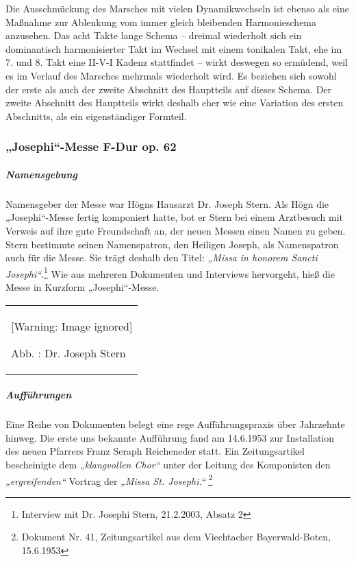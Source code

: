 \documentclass[a4paper]{article}
\newcommand\textstyleZitate[1]{\textit{#1}}
\newcounter{Abb}
\renewcommand\theAbb{\arabic{Abb}}
\begin{document}
Die Ausschmückung des Marsches mit vielen Dynamikwechseln ist ebenso als
eine Maßnahme zur Ablenkung vom immer gleich bleibenden Harmonieschema
anzusehen. Das acht Takte lange Schema – dreimal wiederholt sich ein
dominantisch harmonisierter Takt im Wechsel mit einem tonikalen Takt,
ehe im 7. und 8. Takt eine\newline
II-V-I Kadenz stattfindet – wirkt deswegen so ermüdend, weil es im
Verlauf des Marsches mehrmals wiederholt wird. Es beziehen sich sowohl
der erste als auch der zweite Abschnitt des Hauptteils auf dieses
Schema. Der zweite Abschnitt des Hauptteils wirkt deshalb eher wie eine
Variation des ersten Abschnitts, als ein eigenständiger Formteil.

\subsubsection[„Josephi“{}-Messe F{}-Dur op. 62]{„Josephi“-Messe F-Dur
op. 62}
\label{bkm:Ref98506951}\hypertarget{RefHeadingToc100333755}{}\label{bkm:Ref98506963}\label{bkm:Ref98506955}\subparagraph{Namensgebung}
Namensgeber der Messe war Högns Hausarzt Dr. Joseph Stern. Als Högn die
„Josephi“-Messe fertig komponiert hatte, bot er Stern bei einem
Arztbesuch mit Verweis auf ihre gute Freundschaft an, der neuen Messen
einen Namen zu geben. Stern bestimmte seinen Namenspatron, den Heiligen
Joseph, als Namenspatron auch für die Messe. Sie trägt deshalb den
Titel: \textstyleZitate{„Missa in honorem Sancti Josephi“}.\footnote{
Interview mit Dr. Josephi Stern, 21.2.2003, Absatz 2} Wie aus mehreren
Dokumenten und Interviews hervorgeht, hieß die Messe in Kurzform
„Josephi“-Messe.

\begin{center}
\begin{minipage}{3.884cm}
\begin{flushleft}
\tablefirsthead{}
\tablehead{}
\tabletail{}
\tablelasttail{}
\begin{supertabular}{m{3.684cm}}
  [Warning: Image ignored] %
 
Abb. \stepcounter{Abb}{\theAbb}: Dr. Joseph Stern\\
\end{supertabular}
\end{flushleft}
\end{minipage}
\end{center}
\subparagraph{Aufführungen}
Eine Reihe von Dokumenten belegt eine rege Aufführungspraxis über
Jahrzehnte hinweg. Die erste uns bekannte Aufführung fand am 14.6.1953
zur Installation des neuen Pfarrers Franz Seraph Reicheneder statt. Ein
Zeitungsartikel bescheinigte dem \textstyleZitate{„klangvollen Chor“}
unter der Leitung des Komponisten den \textstyleZitate{„ergreifenden“}
Vortrag der \textstyleZitate{„Missa St. Josephi.“ }\footnote{ Dokument
Nr. 41, Zeitungsartikel aus dem Viechtacher Bayerwald-Boten, 15.6.1953}
\end{document}
